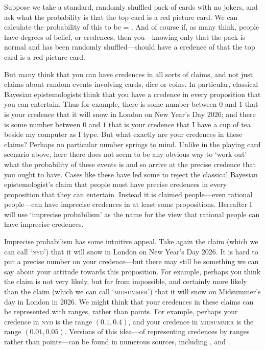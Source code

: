 Suppose we take a standard, randomly shuffled pack of cards with no jokers, and ask what the probability is that the top card is a red picture card. We can calculate the probability of this to be  = . And of course if, as many think, people have degrees of belief, or credences, then you---knowing only that the pack is normal and has been randomly shuffled---should have a credence of  that the top card is a red picture card.

But many think that you can have credences in all sorts of claims, and not just claims about random events involving cards, dice or coins. In particular, classical Bayesian epistemologists think that you have a credence in every proposition that you can entertain. Thus for example, there is some number between $0$ and $1$ that is your credence that it will snow in London on New Year's Day 2026; and there is some number between $0$ and $1$ that is your credence that I have a cup of tea beside my computer as I type. But what exactly are your credences in these claims? Perhaps no particular number springs to mind. Unlike in the playing card scenario above, here there does not seem to be any obvious way to `work out' what the probability of these events is and so arrive at the precise credence that you ought to have. Cases like these have led some to reject the classical Bayesian epistemologist's claim that people must have precise credences in every proposition that they can entertain. Instead it is claimed people---even rational people---can have imprecise credences in at least some propositions. Hereafter I will use `imprecise probabilism' as the name for the view that rational people can have imprecise credences. 

Imprecise probabilism has some intuitive appeal. Take again the claim (which we can call `\textsc{nyd}') that it will snow in London on New Year's Day 2026. It is hard to put a precise number on your credence---but there may still be something we can say about your attitude towards this proposition. For example, perhaps you think the claim is not very likely, but far from impossible, and certainly more likely than the claim (which we can call `\textsc{midsummer}') that it will snow on Midsummer's day in London in 2026. We might think that your credences in these claims can be represented with ranges, rather than points.  For example, perhaps your credence in \textsc{nyd} is the range $(0.1, 0.4)$, and your credence in \textsc{midsummer} is the range $(0.01, 0.05)$.  Versions of this idea---of representing credences by ranges rather than points---can be found in numerous sources, including \citet{bradley2009,gardenforssahlin1982,jeffrey1983humanface,Joyce2005,Kaplan1996,keynes1921,kyburg1983,levi1974,sturgeon2008,vanfraassen2006}, and \citet{walley1991}. 

